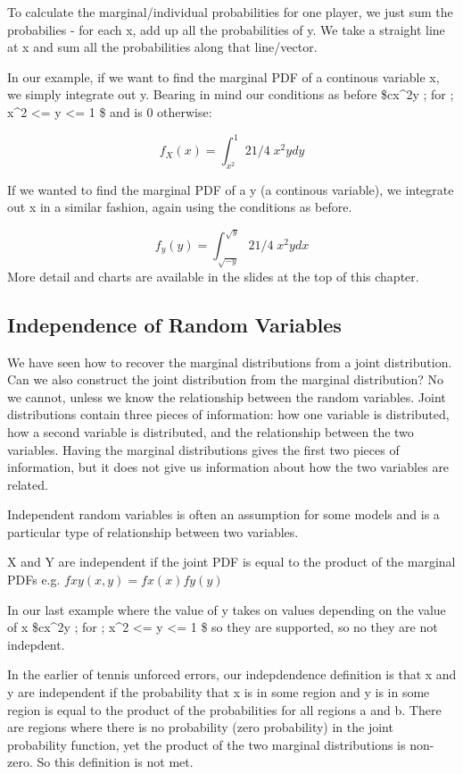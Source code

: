 \documentclass[]{book}
\theoremstyle{definition}
\theoremstyle{definition}
\theoremstyle{definition}
\theoremstyle{remark}
\begin{document}
To calculate the marginal/individual probabilities for one player, we
just sum the probabilies - for each x, add up all the probabilities of
y. We take a straight line at x and sum all the probabilities along that
line/vector.

In our example, if we want to find the marginal PDF of a continous
variable x, we simply integrate out y. Bearing in mind our conditions as
before \$cx\^{}2y ; for ; x\^{}2 \textless{}= y \textless{}= 1 \$ and is
0 otherwise:

\[f_X(x) = \int_{x^2}^{1} 21/4 \; x^2ydy\]

If we wanted to find the marginal PDF of a y (a continous variable), we
integrate out x in a similar fashion, again using the conditions as
before.

\[f_y(y) = \int_{\sqrt{-y}}^{\sqrt{y}} 21/4 \; x^2ydx\] More detail and
charts are available in the slides at the top of this chapter.

\subsection{Independence of Random
Variables}\label{independence-of-random-variables}

We have seen how to recover the marginal distributions from a joint
distribution. Can we also construct the joint distribution from the
marginal distribution? No we cannot, unless we know the relationship
between the random variables. Joint distributions contain three pieces
of information: how one variable is distributed, how a second variable
is distributed, and the relationship between the two variables. Having
the marginal distributions gives the first two pieces of information,
but it does not give us information about how the two variables are
related.

Independent random variables is often an assumption for some models and
is a particular type of relationship between two variables.

X and Y are independent if the joint PDF is equal to the product of the
marginal PDFs e.g. \(fxy(x,y)=fx(x)fy(y)\)

In our last example where the value of y takes on values depending on
the value of x \$cx\^{}2y ; for ; x\^{}2 \textless{}= y \textless{}= 1
\$ so they are supported, so no they are not indepdent.

In the earlier of tennis unforced errors, our indepdendence definition
is that x and y are independent if the probability that x is in some
region and y is in some region is equal to the product of the
probabilities for all regions a and b. There are regions where there is
no probability (zero probability) in the joint probability function, yet
the product of the two marginal distributions is non-zero. So this
definition is not met.
\end{document}
